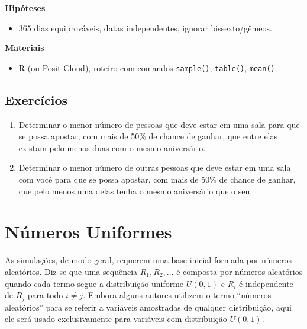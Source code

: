 \documentclass[
  letterpaper,
  DIV=11,
  numbers=noendperiod]{scrreprt}
\providecommand{\tightlist}{%
  \setlength{\itemsep}{0pt}\setlength{\parskip}{0pt}}\usepackage{longtable,booktabs,array}
\begin{document}
\textbf{Hipóteses}

\begin{itemize}
\tightlist
\item
  365 dias equiprováveis, datas independentes, ignorar bissexto/gêmeos.
\end{itemize}

\textbf{Materiais}

\begin{itemize}
\tightlist
\item
  R (ou Posit Cloud), roteiro com comandos \texttt{sample()},
  \texttt{table()}, \texttt{mean()}.
\end{itemize}

\section*{Exercícios}\label{exercuxedcios-4}


\begin{enumerate}
\def\labelenumi{\arabic{enumi})}
\item
  Determinar o menor número de pessoas que deve estar em uma sala para
  que se possa apostar, com mais de 50\% de chance de ganhar, que entre
  elas existam pelo menos duas com o mesmo aniversário.
\item
  Determinar o menor número de outras pessoas que deve estar em uma sala
  com você para que se possa apostar, com mais de 50\% de chance de
  ganhar, que pelo menos uma delas tenha o mesmo aniversário que o seu.
\end{enumerate}


\chapter{Números Uniformes}\label{nuxfameros-uniformes}

As simulações, de modo geral, requerem uma base inicial formada por
números aleatórios. Diz-se que uma sequência \(R_1, R_2, \ldots\) é
composta por números aleatórios quando cada termo segue a distribuição
uniforme \(U(0,1)\) e \(R_i\) é independente de \(R_j\) para todo
\(i \neq j\). Embora alguns autores utilizem o termo ``números
aleatórios'' para se referir a variáveis amostradas de qualquer
distribuição, aqui ele será usado exclusivamente para variáveis com
distribuição \(U(0,1)\).
\end{document}
